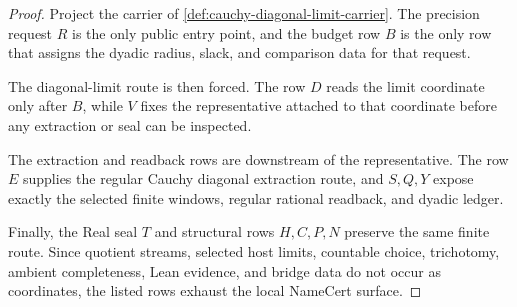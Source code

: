 \begin{proof}
Project the carrier of \autoref{def:cauchy-diagonal-limit-carrier}. The precision request $R$ is the only public entry point, and the budget row $B$ is the only row that assigns the dyadic radius, slack, and comparison data for that request.

The diagonal-limit route is then forced. The row $D$ reads the limit coordinate only after $B$, while $V$ fixes the representative attached to that coordinate before any extraction or seal can be inspected.

The extraction and readback rows are downstream of the representative. The row $E$ supplies the regular Cauchy diagonal extraction route, and $S,Q,Y$ expose exactly the selected finite windows, regular rational readback, and dyadic ledger.

Finally, the Real seal $T$ and structural rows $H,C,P,N$ preserve the same finite route. Since quotient streams, selected host limits, countable choice, trichotomy, ambient completeness, Lean evidence, and bridge data do not occur as coordinates, the listed rows exhaust the local NameCert surface.
\end{proof}

